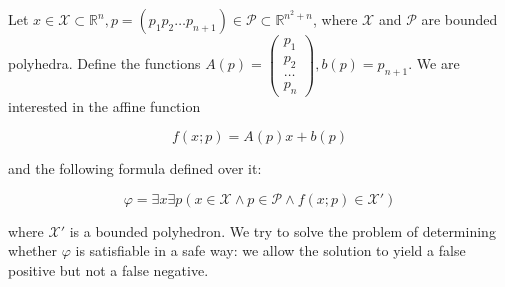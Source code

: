 \documentclass{minimal}
\begin{document}
Let $ x \in \mathcal{X} \subset \mathbb{R}^n, p = (p_1 p_2 \dots p_{n + 1})\in \mathcal{P} \subset \mathbb{R}^{n^2 + n} $, where $ \mathcal{X} $ and $\mathcal{P} $  are bounded polyhedra. Define the functions $ A(p) = \begin{pmatrix} p_1 \\ p_2 \\ \dots \\ p_n \end{pmatrix}, b(p) = p_{n+1} $. We are interested in the affine function

\begin{equation}
    f(x; p) = A(p)x + b(p)
\end{equation}

and the following formula defined over it:

\begin{equation}
    \varphi = \exists x \exists p (x \in \mathcal{X} \land p \in \mathcal{P} \land f(x; p) \in \mathcal{X}')
\end{equation}

where $\mathcal{X}'$ is a bounded polyhedron. We try to solve the problem of determining whether $\varphi$ is satisfiable in a safe way: we allow the solution to yield a false positive but not a false negative.
    
\end{document}
